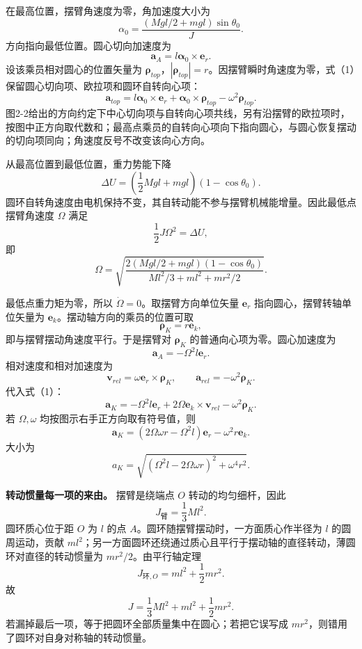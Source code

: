 \documentclass[12pt,a4paper,UTF8]{ctexart}
\begin{document}
在最高位置，摆臂角速度为零，角加速度大小为 \[
\alpha_0=
\frac{(Mgl/2+mgl)\sin\theta_0}{J}. \tag{4}
\] 方向指向最低位置。圆心切向加速度为 \[
\boldsymbol a_A=l\boldsymbol\alpha_0\times\boldsymbol e_r. \tag{5}
\] 设该乘员相对圆心的位置矢量为
\(\boldsymbol\rho_{top}\)，\(|\boldsymbol\rho_{top}|=r\)。因摆臂瞬时角速度为零，式（1）保留圆心切向项、欧拉项和圆环自转向心项：
\[
\boxed{
\boldsymbol a_{top}
=l\boldsymbol\alpha_0\times\boldsymbol e_r
+\boldsymbol\alpha_0\times\boldsymbol\rho_{top}
-\omega^2\boldsymbol\rho_{top}
}. \tag{6}
\]
图2-2给出的方向约定下中心切向项与自转向心项共线，另有沿摆臂的欧拉项时，按图中正方向取代数和；最高点乘员的自转向心项向下指向圆心，与圆心恢复摆动的切向项同向；角速度反号不改变该向心方向。

从最高位置到最低位置，重力势能下降 \[
\Delta U=\left(\frac12Mgl+mgl\right)(1-\cos\theta_0). \tag{7}
\]
圆环自转角速度由电机保持不变，其自转动能不参与摆臂机械能增量。因此最低点摆臂角速度
\(\Omega\) 满足 \[
\frac12J\Omega^2=\Delta U, \tag{8}
\] 即 \[
\boxed{
\Omega=\sqrt{
\frac{2(Mgl/2+mgl)(1-\cos\theta_0)}
{Ml^2/3+ml^2+mr^2/2}}
}. \tag{9}
\]

最低点重力矩为零，所以 \(\dot\Omega=0\)。取摆臂方向单位矢量
\(\boldsymbol e_r\) 指向圆心，摆臂转轴单位矢量为
\(\boldsymbol e_k\)。摆动轴方向的乘员的位置可取 \[
\boldsymbol\rho_K=r\boldsymbol e_k, \tag{10}
\] 即与摆臂摆动角速度平行。于是摆臂对 \(\boldsymbol\rho_K\)
的普通向心项为零。圆心加速度为 \[
\boldsymbol a_A=-\Omega^2l\boldsymbol e_r. \tag{11}
\] 相对速度和相对加速度为 \[
\boldsymbol v_{rel}=\omega\boldsymbol e_r\times\boldsymbol\rho_K,
\qquad
\boldsymbol a_{rel}=-\omega^2\boldsymbol\rho_K. \tag{12}
\] 代入式（1）： \[
\boxed{
\boldsymbol a_K
=-\Omega^2l\boldsymbol e_r
+2\Omega\boldsymbol e_k\times\boldsymbol v_{rel}
-\omega^2\boldsymbol\rho_K
}. \tag{13}
\] 若 \(\Omega,\omega\) 均按图示右手正方向取有符号值，则 \[
\boldsymbol a_K
=(2\Omega\omega r-\Omega^2l)\boldsymbol e_r
-\omega^2r\boldsymbol e_k. \tag{14}
\] 大小为 \[
\boxed{
a_K=\sqrt{(\Omega^2l-2\Omega\omega r)^2+\omega^4r^2}
}. \tag{15}
\]

\textbf{转动惯量每一项的来由。} 摆臂是绕端点 \(O\) 转动的均匀细杆，因此
\[
J_{\text{臂}}=\frac13Ml^2.
\] 圆环质心位于距 \(O\) 为 \(l\) 的点
\(A\)。圆环随摆臂摆动时，一方面质心作半径为 \(l\) 的圆周运动，贡献
\(ml^2\)；另一方面圆环还绕通过质心且平行于摆动轴的直径转动，薄圆环对直径的转动惯量为
\(mr^2/2\)。由平行轴定理 \[
J_{\text{环},O}=ml^2+\frac12mr^2.
\] 故 \[
J=\frac13Ml^2+ml^2+\frac12mr^2.
\] 若漏掉最后一项，等于把圆环全部质量集中在圆心；若把它误写成
\(mr^2\)，则错用了圆环对自身对称轴的转动惯量。
\end{document}
